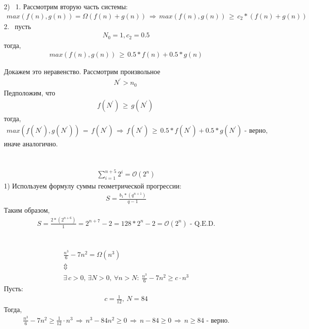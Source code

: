 \documentclass{homework}
\begin{document}
2) \ 1. Рассмотрим вторую часть системы:
	\begin{gather*}
        max(f(n), g(n)) = \Omega(f(n) + g(n)) \, \Rightarrow \, max(f(n), g(n)) \, \geq \, c_2 * (f(n) + g(n)) \
        \end{gather*}  
        2. \
        пусть 
        \begin{gather*}
        N_0 = 1, c_2 = 0.5
        \end{gather*}
        тогда,
        \begin{gather*}
        max(f(n), g(n)) \, \geq \, 0.5 * f(n) + 0.5 * g(n)
        \end{gather*}

Докажем это неравенство. Рассмотрим произвольное 
\begin{gather*}
        N^{\prime} > n_0 \
        \end{gather*}
Педположим, что
\begin{gather*}
        f(N^{\prime}) \, \geq \, g(N^{\prime}) \
        \end{gather*}
тогда,
\begin{gather*}
        max(f(N^{\prime}), g(N^{\prime})) \, = \, f(N^{\prime}) \, \Rightarrow \, f(N^{\prime}) \, \geq \, 0.5 * f(N^{\prime}) + 0.5 * g(N^{\prime}) \text{ - верно,}
        \end{gather*}
иначе аналогично.

\section{} 
\label{sec:3}
 \begin{gather*}
		\displaystyle\sum_{i = 1}^{n+5} 2^i = \mathcal{O}(2^n)
		\end{gather*}
1) Используем формулу суммы геометрической прогрессии:  
  \begin{gather*}  
        S = \frac{b_1*(q^{n+1})}{q - 1}
	\end{gather*}
 Таким образом,
 \begin{gather*}  
        S = \frac{2*(2^{n+6})}{1} = 2^{n+7} - 2 = 128 * 2 ^ n - 2 = \mathcal{O}(2^n) \text{ - Q.E.D.}
	\end{gather*}
  

\section{} 
\label{sec:4}
	\begin{gather*}
		\frac{n^3}{6} - 7n^2 = \Omega(n^3)
		\\
		\Updownarrow
		\\
		\exists \, c>0,\, \exists N>0,\: \forall n > N:\: \frac{n^3}{6} - 7n^2 \geq c\cdot n^3
		\end{gather*}
Пусть:
		\begin{gather*}
		c = \frac{1}{12},\: N = 84
		\end{gather*}
Тогда, 
            \begin{gather*}
		\frac{n^3}{6} - 7n^2 \geq \frac{1}{12}\cdot n^3  \, \Rightarrow \,
		n^3 - 84n^2 \geq 0
		 \, \Rightarrow \,
		n - 84 \geq 0 
		 \, \Rightarrow \,
		n \geq 84\text{ - верно.}
	\end{gather*}
\end{document}
